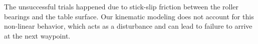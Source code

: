 \begin{figure}[htbp]
\begin{centering}
\end{centering}
\end{figure}

The unsuccessful trials happened due to stick-slip friction between the roller bearings and the table surface.
Our kinematic modeling does not account for this non-linear behavior, which acts as a disturbance and can lead to failure to arrive at the next waypoint.

